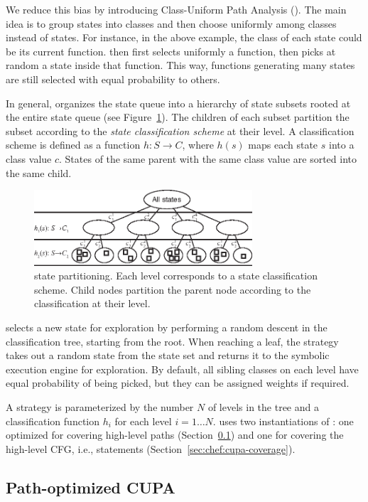 We reduce this bias by introducing Class-Uniform Path Analysis (\cupa).
%
The main idea is to group states into classes and then choose uniformly among classes instead of states.  For instance, in the above example, the class of each state could be its current function.  \cupa then first selects uniformly a function, then picks at random a state inside that function.  This way, functions generating many states are still selected with equal probability to others.

In general, \cupa organizes the state queue into a hierarchy of state subsets rooted at the entire state queue (see Figure~\ref{fig:cupa}).  The children of each subset partition the subset according to the \emph{state classification scheme} at their level.  A classification scheme is defined as a function $h: S \rightarrow C$, where $h(s)$ maps each state $s$ into a class value $c$.  States of the same parent with the same class value are sorted into the same child.
%
\begin{figure}
  \centering
  \includegraphics[width=3.2in]{figures/cupa/cupa}
  \caption{\cupa state partitioning.  Each level corresponds to a state classification scheme.  Child nodes partition the parent node according to the classification at their level.}
  \label{fig:cupa}
\end{figure}
%
\cupa selects a new state for exploration by performing a random descent in the classification tree, starting from the root.  When reaching a leaf, the strategy takes out a random state from the state set and returns it to the symbolic execution engine for exploration.  By default, all sibling classes on each level have equal probability of being picked, but they can be assigned weights if required.

A \cupa strategy is parameterized by the number $N$ of levels in the tree and a classification function $h_i$ for each level $i=1 \ldots N$.  \chef uses two instantiations of \cupa: one optimized for covering high-level paths (Section~\ref{sec:chef:cupa-paths}) and one for covering the high-level CFG, i.e., statements (Section~\ref{sec:chef:cupa-coverage}).

\subsection{Path-optimized CUPA}
\label{sec:chef:cupa-paths}

